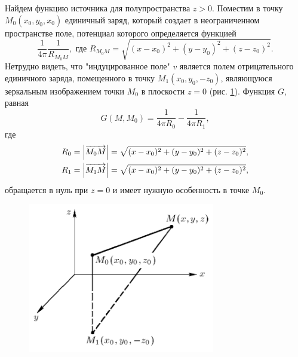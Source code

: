 Найдем функцию источника для полупространства $z > 0$. Поместим в точку $M_0(x_0, y_0, x_0)$ единичный заряд, который создает в неограниченном пространстве поле, потенциал которого определяется функцией 
\begin{equation*}
	\frac{1}{4 \pi} \frac{1}{R_{M_0 M}}, \text{ где } R_{M_0 M} = \sqrt{(x - x_0)^2 + (y - y_0)^2 + (z - z_0)^2}.
\end{equation*}
Нетрудно видеть, что "индуцированное поле" $v$ является полем отрицательного единичного заряда, помещенного в точку $M_1(x_0, y_0, -z_0)$, являющуюся зеркальным изображением точки $M_0$ в плоскости $z = 0$ (рис. \ref{halfdim_green}). 
Функция $G$, равная
\begin{equation*}
	G(M, M_0) = \frac{1}{4 \pi R_0} - \frac{1}{4 \pi R_1},
\end{equation*}
где
\begin{align*}
	R_0 = \abs{\overrightarrow{M_0 M}} = \sqrt{(x - x_0)^2 + (y - y_0)^2 + (z - z_0)^2}, \\
	R_1 = \abs{\overrightarrow{M_1 M}} = \sqrt{(x - x_0)^2 + (y - y_0)^2 + (z - z_0)^2}, \\
\end{align*}
обращается в нуль при $z = 0$ и имеет нужную особенность в точке $M_0$.

\begin{figure}[H]
	\centering
	\includegraphics[width=0.4\linewidth]{img/halfdim_green}
	\caption{}
	\label{halfdim_green}
\end{figure}
